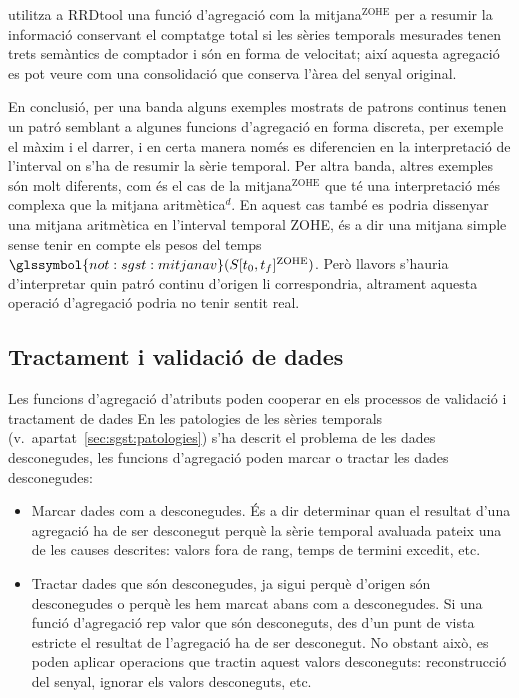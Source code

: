 \textcite{rrdtool} utilitza a RRDtool una funció d'agregació com la
mitjana$^\text{ZOHE}$ per a resumir la informació conservant el
comptatge total si les sèries temporals mesurades tenen trets
semàntics de comptador i són en forma de velocitat; així aquesta
agregació es pot veure com una consolidació que conserva l'àrea del
senyal original.


En conclusió, per una banda alguns exemples mostrats de patrons
continus tenen un patró semblant a algunes funcions d'agregació en
forma discreta, per exemple el màxim i el darrer, i en certa manera
només es diferencien en la interpretació de l'interval on s'ha de
resumir la sèrie temporal. Per altra banda, altres exemples són molt
diferents, com és el cas de la mitjana$^\text{ZOHE}$ que té una
interpretació més complexa que la mitjana aritmètica$^d$. En aquest
cas també es podria dissenyar una mitjana aritmètica en l'interval
temporal ZOHE, és a dir una mitjana simple sense tenir en compte els
pesos del temps
$\glssymbol{not:sgst:mitjanav}(S[t_0,t_f]^\text{ZOHE})$. Però llavors
s'hauria d'interpretar quin patró continu d'origen li correspondria,
altrament aquesta operació d'agregació podria no tenir sentit real.








\subsection{Tractament i validació de dades}

Les funcions d'agregació d'atributs poden cooperar en els processos de
validació i tractament de dades En les patologies de les sèries
temporals (v.\ apartat~\ref{sec:sgst:patologies}) s'ha descrit el
problema de les dades desconegudes, les funcions d'agregació poden
marcar o tractar les dades desconegudes:
\begin{itemize}
\item Marcar dades com a desconegudes. És a dir determinar quan el
  resultat d'una agregació ha de ser desconegut perquè la sèrie
  temporal avaluada pateix una de les causes descrites: valors fora de
  rang, temps de termini excedit, etc.

\item Tractar dades que són desconegudes, ja sigui perquè d'origen són
  desconegudes o perquè les hem marcat abans com a desconegudes.
  Si una funció d'agregació rep valor que són desconeguts, des d'un
  punt de vista estricte el resultat de l'agregació ha de ser
  desconegut. No obstant això, es poden aplicar operacions que tractin
  aquest valors desconeguts: reconstrucció del senyal, ignorar els
  valors desconeguts, etc.
\end{itemize}


